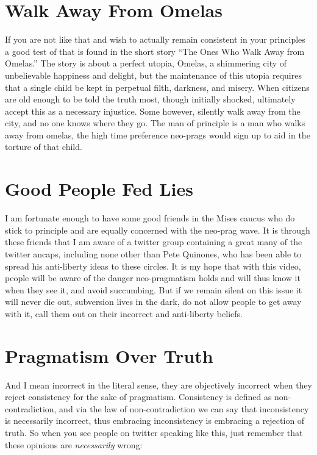 \documentclass[11pt]{article}
\begin{document}
\section{Walk Away From Omelas}
\label{sec:org14c5852}
If you are not like that and wish to actually remain consistent in your principles a good test of that is found in the short story ``The Ones Who Walk Away from Omelas.'' The story is about a perfect utopia, Omelas, a shimmering city of unbelievable happiness and delight, but the maintenance of this utopia requires that a single child be kept in perpetual filth, darkness, and misery. When citizens are old enough to be told the truth most, though initially shocked, ultimately accept this as a necessary injustice. Some however, silently walk away from the city, and no one knows where they go. The man of principle is a man who walks away from omelas, the high time preference neo-prags would sign up to aid in the torture of that child.

\section{Good People Fed Lies}
\label{sec:org2a8a915}
I am fortunate enough to have some good friends in the Mises caucus who do stick to principle and are equally concerned with the neo-prag wave. It is through these friends that I am aware of a twitter group containing a great many of the twitter ancaps, including none other than Pete Quinones, who has been able to spread his anti-liberty ideas to these circles. It is my hope that with this video, people will be aware of the danger neo-pragmatism holds and will thus know it when they see it, and avoid succumbing. But if we remain silent on this issue it will never die out, subversion lives in the dark, do not allow people to get away with it, call them out on their incorrect and anti-liberty beliefs.

\section{Pragmatism Over Truth}
\label{sec:org74ba44e}
And I mean incorrect in the literal sense, they are objectively incorrect when they reject consistency for the sake of pragmatism. Consistency is defined as non-contradiction, and via the law of non-contradiction we can say that inconsistency is necessarily incorrect, thus embracing inconsistency is embracing a rejection of truth. So when you see people on twitter speaking like this, just remember that these opinions are \emph{necessarily} wrong:
\end{document}
